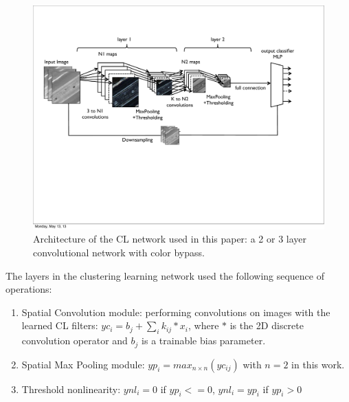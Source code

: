 \documentclass{article} %
\begin{document}
\begin{figure}
\includegraphics[width=5in]{fig-netarch.pdf}
\caption{Architecture of the CL network used in this paper: a 2 or 3 layer convolutional network with color bypass.}
\label{fig-netarch}
\end{figure}


The layers in the clustering learning network used the following sequence of operations:
\begin{enumerate}
\item Spatial Convolution module: performing convolutions on images with the learned CL filters: $yc_i=b_j+\sum_i{k_{ij}\ast x_i}$, where $\ast$ is the 2D discrete convolution operator and $b_j$ is a trainable bias parameter.
\item Spatial Max Pooling module: $yp_i = max_{n \times n}(yc_{ij})$ with $n =  2$ in this work.
\item Threshold nonlinearity: $ynl_i = 0$ if $yp_i <= 0$, $ynl_i = yp_i$ if $yp_i > 0$
\end{enumerate}
\end{document}
